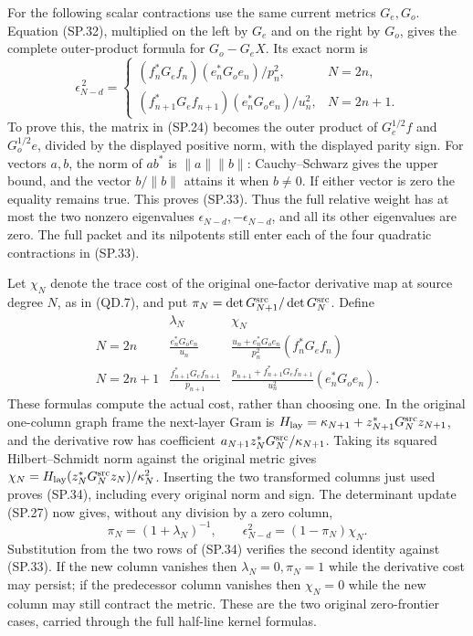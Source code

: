 For the following scalar contractions use the same current metrics
\(G_e,G_o\). Equation (SP.32), multiplied on the left by \(G_e\)
and on the right by \(G_o\), gives the complete outer-product
formula for \(G_o-G_eX\). Its exact norm is
\[
 \boxed{
 \epsilon_{N-d}^{\,2}=
 \begin{cases}
  (f_n^*G_ef_n)(e_n^*G_oe_n)/p_n^2,&N=2n,\\[2pt]
  (f_{n+1}^*G_ef_{n+1})(e_n^*G_oe_n)/u_n^2,&N=2n+1.
 \end{cases}}
 \tag{SP.33}
\]
To prove this, the matrix in (SP.24) becomes the outer product
of \(G_e^{1/2}f\) and \(G_o^{1/2}e\), divided by the
displayed positive norm, with the displayed parity sign. For
vectors \(a,b\), the norm of \(ab^*\) is \(\|a\|\|b\|\):
Cauchy--Schwarz gives the upper bound, and the vector
\(b/\|b\|\) attains it when \(b\ne0\). If either vector
is zero the equality remains true. This proves (SP.33).
Thus the full relative weight has at most the two nonzero eigenvalues
\(\epsilon_{N-d},-\epsilon_{N-d}\), and all its other eigenvalues
are zero. The full packet and its nilpotents still enter each of
the four quadratic contractions in (SP.33).

Let \(\chi_N\) denote the trace cost of the original one-factor
derivative map at source degree \(N\), as in (QD.7), and put
\(\pi_N=\det G_{N+1}^{\rm src}/\det G_N^{\rm src}\). Define
\[
 \begin{array}{c|c|c}
 &\lambda_N&\chi_N\\\hline
 N=2n&\displaystyle\frac{e_n^*G_oe_n}{u_n}
 &\displaystyle\frac{u_n+e_n^*G_oe_n}{p_n^2}
                              (f_n^*G_ef_n)\\[7pt]
 N=2n+1&\displaystyle\frac{f_{n+1}^*G_ef_{n+1}}{p_{n+1}}
 &\displaystyle\frac{p_{n+1}+f_{n+1}^*G_ef_{n+1}}{u_n^2}
                              (e_n^*G_oe_n).
 \end{array}
 \tag{SP.34}
\]
These formulas compute the actual cost, rather than choosing one.
In the original one-column graph frame the next-layer Gram is
\(H_{\rm lay}=\kappa_{N+1}+z_{N+1}^*G_N^{\rm src}z_{N+1}\),
and the derivative row has coefficient
\(a_{N+1}z_N^*G_N^{\rm src}/\kappa_{N+1}\).
Taking its squared Hilbert--Schmidt norm against the original
metric gives
\(\chi_N=H_{\rm lay}(z_N^*G_N^{\rm src}z_N)/\kappa_N^2\).
Inserting the two transformed columns just used proves (SP.34),
including every original norm and sign. The determinant update
(SP.27) now gives, without any division by a zero column,
\[
 \pi_N=(1+\lambda_N)^{-1},\qquad
 \epsilon_{N-d}^2=(1-\pi_N)\chi_N.
 \tag{SP.35}
\]
Substitution from the two rows of (SP.34) verifies the second
identity against (SP.33). If the new column vanishes then
\(\lambda_N=0,\pi_N=1\) while the derivative cost may persist;
if the predecessor column vanishes then \(\chi_N=0\) while
the new column may still contract the metric. These are the two
original zero-frontier cases, carried through the full half-line
kernel formulas.
